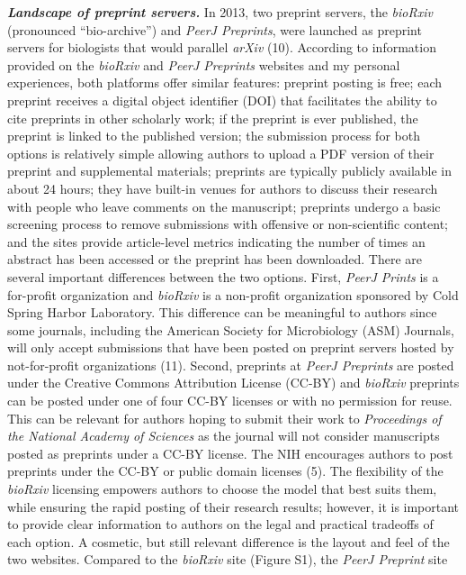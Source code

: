 \documentclass[11,]{article}
\begin{document}
\textbf{\emph{Landscape of preprint servers.}} In 2013, two preprint
servers, the \emph{bioRxiv} (pronounced ``bio-archive'') and \emph{PeerJ
Preprints}, were launched as preprint servers for biologists that would
parallel \emph{arXiv} (10). According to information provided on the
\emph{bioRxiv} and \emph{PeerJ Preprints} websites and my personal
experiences, both platforms offer similar features: preprint posting is
free; each preprint receives a digital object identifier (DOI) that
facilitates the ability to cite preprints in other scholarly work; if
the preprint is ever published, the preprint is linked to the published
version; the submission process for both options is relatively simple
allowing authors to upload a PDF version of their preprint and
supplemental materials; preprints are typically publicly available in
about 24 hours; they have built-in venues for authors to discuss their
research with people who leave comments on the manuscript; preprints
undergo a basic screening process to remove submissions with offensive
or non-scientific content; and the sites provide article-level metrics
indicating the number of times an abstract has been accessed or the
preprint has been downloaded. There are several important differences
between the two options. First, \emph{PeerJ Prints} is a for-profit
organization and \emph{bioRxiv} is a non-profit organization sponsored
by Cold Spring Harbor Laboratory. This difference can be meaningful to
authors since some journals, including the American Society for
Microbiology (ASM) Journals, will only accept submissions that have been
posted on preprint servers hosted by not-for-profit organizations (11).
Second, preprints at \emph{PeerJ Preprints} are posted under the
Creative Commons Attribution License (CC-BY) and \emph{bioRxiv}
preprints can be posted under one of four CC-BY licenses or with no
permission for reuse. This can be relevant for authors hoping to submit
their work to \emph{Proceedings of the National Academy of Sciences} as
the journal will not consider manuscripts posted as preprints under a
CC-BY license. The NIH encourages authors to post preprints under the
CC-BY or public domain licenses (5). The flexibility of the
\emph{bioRxiv} licensing empowers authors to choose the model that best
suits them, while ensuring the rapid posting of their research results;
however, it is important to provide clear information to authors on the
legal and practical tradeoffs of each option. A cosmetic, but still
relevant difference is the layout and feel of the two websites. Compared
to the \emph{bioRxiv} site (Figure S1), the \emph{PeerJ Preprint} site
\end{document}
